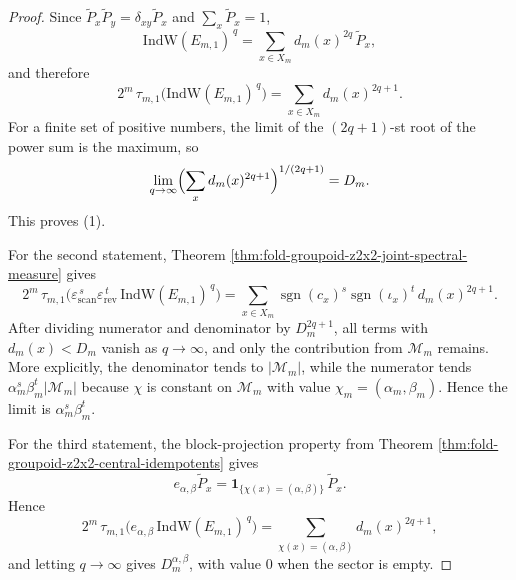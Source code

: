\begin{proof}
Since \(\widetilde P_x\widetilde P_y=\delta_{xy}\widetilde P_x\) and \(\sum_x\widetilde P_x=1\),
\[
\mathrm{IndW}(E_{m,1})^{\,q}=\sum_{x\in X_m} d_m(x)^{2q}\,\widetilde P_x,
\]
and therefore
\[
2^m\,\tau_{m,1}\!\bigl(\mathrm{IndW}(E_{m,1})^{\,q}\bigr)
=
\sum_{x\in X_m}d_m(x)^{2q+1}.
\]
For a finite set of positive numbers, the limit of the \((2q+1)\)-st root of the power sum is the maximum, so
\[
\lim_{q\to\infty}\Bigl(\sum_x d_m(x)^{2q+1}\Bigr)^{1/(2q+1)}=D_m.
\]
This proves (1).

For the second statement, Theorem \ref{thm:fold-groupoid-z2x2-joint-spectral-measure} gives
\[
2^m\,\tau_{m,1}\!\bigl(\varepsilon_{\mathrm{scan}}^{\,s}\varepsilon_{\mathrm{rev}}^{\,t}\,\mathrm{IndW}(E_{m,1})^{\,q}\bigr)
=
\sum_{x\in X_m}\operatorname{sgn}(c_x)^s\operatorname{sgn}(\iota_x)^t\,d_m(x)^{2q+1}.
\]
After dividing numerator and denominator by \(D_m^{2q+1}\), all terms with \(d_m(x)<D_m\) vanish as \(q\to\infty\), and only the contribution from \(\mathcal M_m\) remains.
More explicitly, the denominator tends to \(|\mathcal M_m|\), while the numerator tends \(\alpha_m^s\beta_m^t|\mathcal M_m|\) because \(\chi\) is constant on \(\mathcal M_m\) with value \(\chi_m=(\alpha_m,\beta_m)\). Hence the limit is \(\alpha_m^s\beta_m^t\).

For the third statement, the block-projection property from Theorem \ref{thm:fold-groupoid-z2x2-central-idempotents} gives
\[
e_{\alpha,\beta}\widetilde P_x=\mathbf{1}_{\{\chi(x)=(\alpha,\beta)\}}\,\widetilde P_x.
\]
Hence
\[
2^m\,\tau_{m,1}\!\bigl(e_{\alpha,\beta}\,\mathrm{IndW}(E_{m,1})^{\,q}\bigr)
=
\sum_{\chi(x)=(\alpha,\beta)} d_m(x)^{2q+1},
\]
and letting \(q\to\infty\) gives \(D_m^{\alpha,\beta}\), with value \(0\) when the sector is empty.
\end{proof}

